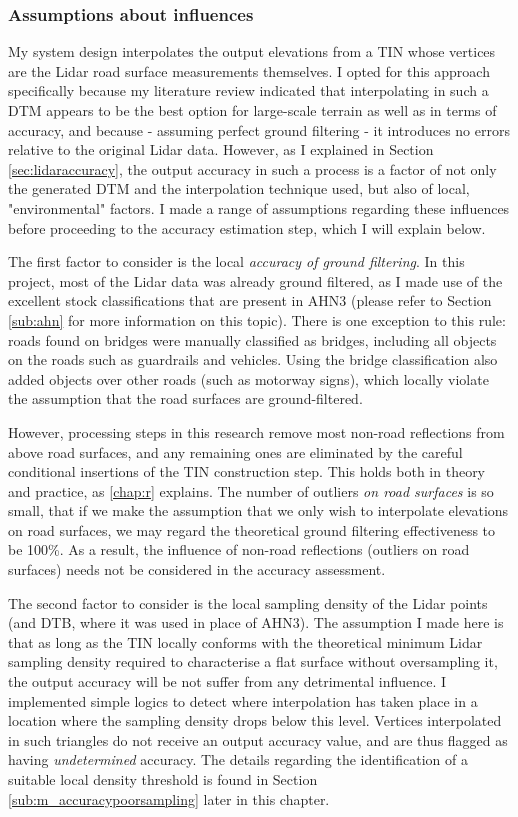 \subsubsection{Assumptions about influences}

My system design interpolates the output elevations from a TIN whose vertices are the Lidar road surface measurements themselves. I opted for this approach specifically because my literature review indicated that interpolating in such a DTM appears to be the best option for large-scale terrain as well as in terms of accuracy, and because - assuming perfect ground filtering - it introduces no errors relative to the original Lidar data. However, as I explained in Section \ref{sec:lidaraccuracy}, the output accuracy in such a process is a factor of not only the generated DTM and the interpolation technique used, but also of local, "environmental" factors. I made a range of assumptions regarding these influences before proceeding to the accuracy estimation step, which I will explain below.

The first factor to consider is the local \textit{accuracy of ground filtering}. In this project, most of the Lidar data was already ground filtered, as I made use of the excellent stock classifications that are present in AHN3 (please refer to Section \ref{sub:ahn} for more information on this topic). There is one exception to this rule: roads found on bridges were manually classified as bridges, including all objects on the roads such as guardrails and vehicles. Using the bridge classification also added objects over other roads (such as motorway signs), which locally violate the assumption that the road surfaces are ground-filtered.

However, processing steps in this research remove most non-road reflections from above road surfaces, and any remaining ones are eliminated by the careful conditional insertions of the TIN construction step. This holds both in theory and practice, as \ref{chap:r} explains. The number of outliers \textit{on road surfaces} is so small, that if we make the assumption that we only wish to interpolate elevations on road surfaces, we may regard the theoretical ground filtering effectiveness to be 100\%. As a result, the influence of non-road reflections (outliers on road surfaces) needs not be considered in the accuracy assessment.

The second factor to consider is the local sampling density of the Lidar points (and DTB, where it was used in place of AHN3). The assumption I made here is that as long as the TIN locally conforms with the theoretical minimum Lidar sampling density required to characterise a flat surface without oversampling it, the output accuracy will be not suffer from any detrimental influence. I implemented simple logics to detect where interpolation has taken place in a location where the sampling density drops below this level. Vertices interpolated in such triangles do not receive an output accuracy value, and are thus flagged as having \textit{undetermined} accuracy. The details regarding the identification of a suitable local density threshold is found in Section \ref{sub:m_accuracypoorsampling} later in this chapter.

